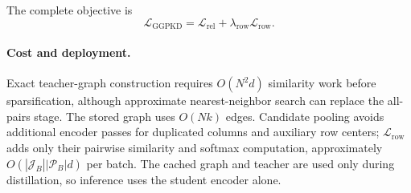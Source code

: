 The complete objective is
\begin{equation}
\mathcal L_{\mathrm{GGPKD}}
=\mathcal L_{\mathrm{rel}}
+\lambda_{\mathrm{row}}\mathcal L_{\mathrm{row}}.
\label{eq:full-objective}
\end{equation}

\paragraph{Cost and deployment.}
Exact teacher-graph construction requires $O(N^2d)$ similarity work before sparsification, although approximate nearest-neighbor search can replace the all-pairs stage. The stored graph uses $O(Nk)$ edges. Candidate pooling avoids additional encoder passes for duplicated columns and auxiliary row centers; $\mathcal L_{\mathrm{row}}$ adds only their pairwise similarity and softmax computation, approximately $O(|\mathcal J_B||\mathcal P_B|d)$ per batch. The cached graph and teacher are used only during distillation, so inference uses the student encoder alone.
